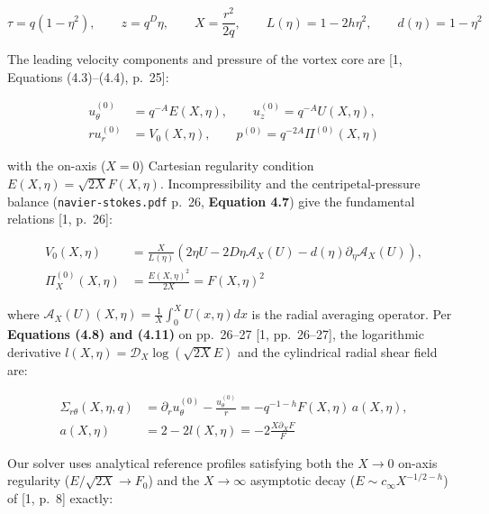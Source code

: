 \documentclass[12pt,a4paper]{article}
\begin{document}
\begin{equation}
\tau = q(1 - \eta^2), \qquad z = q^D \eta, \qquad X = \frac{r^2}{2q}, \qquad L(\eta) = 1 - 2h\eta^2, \qquad d(\eta) = 1 - \eta^2
\end{equation}

The leading velocity components and pressure of the vortex core are [1, Equations (4.3)--(4.4), p.\ 25]:

\begin{equation}
\begin{split}
u_\theta^{(0)} &= q^{-A} E(X, \eta), \qquad u_z^{(0)} = q^{-A} U(X, \eta), \\
r u_r^{(0)} &= V_0(X, \eta), \qquad p^{(0)} = q^{-2A} \Pi^{(0)}(X, \eta)
\end{split}
\end{equation}

with the on-axis ($X=0$) Cartesian regularity condition $E(X, \eta) = \sqrt{2X} F(X, \eta)$. Incompressibility and the centripetal-pressure balance (\texttt{navier-stokes.pdf} p.\ 26, \textbf{Equation 4.7}) give the fundamental relations [1, p.\ 26]:

\begin{equation}
\begin{split}
V_0(X, \eta) &= \frac{X}{L(\eta)} \left( 2\eta U - 2D\eta \mathcal{A}_X(U) - d(\eta) \partial_\eta \mathcal{A}_X(U) \right), \\
\Pi_X^{(0)}(X, \eta) &= \frac{E(X, \eta)^2}{2X} = F(X, \eta)^2
\end{split}
\end{equation}

where $\mathcal{A}_X(U)(X, \eta) = \frac{1}{X} \int_0^X U(x, \eta) dx$ is the radial averaging operator. Per \textbf{Equations (4.8) and (4.11)} on pp.\ 26--27 [1, pp.\ 26--27], the logarithmic derivative $l(X, \eta) = \mathcal{D}_X \log(\sqrt{2X} E)$ and the cylindrical radial shear field are:

\begin{equation}
\begin{split}
\Sigma_{r\theta}(X, \eta, q) &= \partial_r u_\theta^{(0)} - \frac{u_\theta^{(0)}}{r} = -q^{-1-h} F(X, \eta) \, a(X, \eta), \\
a(X, \eta) &= 2 - 2l(X, \eta) = -2 \frac{X \partial_X F}{F}
\end{split}
\end{equation}

Our solver uses analytical reference profiles satisfying both the $X \to 0$ on-axis regularity ($E/\sqrt{2X} \to F_0$) and the $X \to \infty$ asymptotic decay ($E \sim c_\infty X^{-1/2-h}$) of [1, p.\ 8] exactly:
\end{document}
